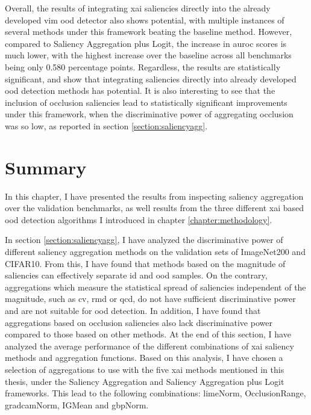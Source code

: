 \documentclass[UKenglish]{uiomasterthesis} %
\theoremstyle{definition}
\begin{document}
Overall, the results of integrating \ac{xai} saliencies directly into the already developed \ac{vim} \ac{ood} detector also shows potential, with multiple instances of several methods under this framework beating the baseline method. However, compared to Saliency Aggregation plus Logit, the increase in \ac{auroc} scores is much lower, with the highest increase over the baseline across all benchmarks being only 0.580 percentage points. Regardless, the results are statistically significant, and show that integrating saliencies directly into already developed \ac{ood} detection methods has potential. It is also interesting to see that the inclusion of occlusion saliencies lead to statistically significant improvements under this framework, when the discriminative power of aggregating occlusion was so low, as reported in section \ref{section:saliencyagg}.

\section{Summary}

In this chapter, I have presented the results from inspecting saliency aggregation over the validation benchmarks, as well results from the three different \ac{xai} based \ac{ood} detection algorithms I introduced in chapter \ref{chapter:methodology}.

In section \ref{section:saliencyagg}, I have analyzed the discriminative power of different saliency aggregation methods on the validation sets of ImageNet200 and CIFAR10. From this, I have found that methods based on the magnitude of saliencies can effectively separate \ac{id} and \ac{ood} samples. On the contrary, aggregations which measure the statistical spread of saliencies independent of the magnitude, such as \ac{cv}, \ac{rmd} or \ac{qcd}, do not have sufficient discriminative power and are not suitable for \ac{ood} detection. In addition, I have found that aggregations based on occlusion saliencies also lack discriminative power compared to those based on other methods. At the end of this section, I have analyzed the average performance of the different combinations of \ac{xai} saliency methods and aggregation functions. Based on this analysis, I have chosen a selection of aggregations to use with the five \ac{xai} methods mentioned in this thesis, under the Saliency Aggregation and Saliency Aggregation plus Logit frameworks. This lead to the following combinations: \ac{lime}Norm, OcclusionRange, \ac{gradcam}Norm, IGMean and \ac{gbp}Norm.
\end{document}
